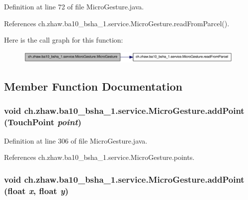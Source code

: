 Definition at line 72 of file MicroGesture.java.

References ch.zhaw.ba10\_\-bsha\_\-1.service.MicroGesture.readFromParcel().

Here is the call graph for this function:\nopagebreak
\begin{figure}[H]
\begin{center}
\leavevmode
\includegraphics[width=315pt]{classch_1_1zhaw_1_1ba10__bsha__1_1_1service_1_1MicroGesture_a915edd1a693527b48678802234a9d37d_cgraph}
\end{center}
\end{figure}


\subsection{Member Function Documentation}
\hypertarget{classch_1_1zhaw_1_1ba10__bsha__1_1_1service_1_1MicroGesture_a3a553d36d664db7199804f09f08d28cf}{
\subsubsection[{addPoint}]{\setlength{\rightskip}{0pt plus 5cm}void ch.zhaw.ba10\_\-bsha\_\-1.service.MicroGesture.addPoint ({\bf TouchPoint} {\em point})}}
\label{classch_1_1zhaw_1_1ba10__bsha__1_1_1service_1_1MicroGesture_a3a553d36d664db7199804f09f08d28cf}


Definition at line 306 of file MicroGesture.java.

References ch.zhaw.ba10\_\-bsha\_\-1.service.MicroGesture.points.\hypertarget{classch_1_1zhaw_1_1ba10__bsha__1_1_1service_1_1MicroGesture_a328c48ead9f14d52e747a54a970fdd9e}{
\subsubsection[{addPoint}]{\setlength{\rightskip}{0pt plus 5cm}void ch.zhaw.ba10\_\-bsha\_\-1.service.MicroGesture.addPoint (float {\em x}, \/  float {\em y})}}
\label{classch_1_1zhaw_1_1ba10__bsha__1_1_1service_1_1MicroGesture_a328c48ead9f14d52e747a54a970fdd9e}


